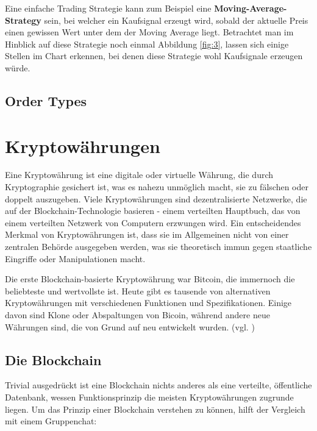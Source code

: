 \documentclass[oneside]{ausarbeitung}
\begin{document}
Eine einfache Trading Strategie kann zum Beispiel eine
\textbf{Moving-Average-Strategy} sein, bei welcher ein Kaufsignal
erzeugt wird, sobald der aktuelle Preis einen gewissen Wert unter dem
der Moving Average liegt. Betrachtet man im Hinblick auf diese
Strategie noch einmal Abbildung \ref{fig:3}, lassen sich einige
Stellen im Chart erkennen, bei denen diese Strategie wohl Kaufsignale
erzeugen würde.

\subsection{Order Types}
\label{sub:order_types}


\section{Kryptowährungen}
\label{sec:kryptowährungen}

Eine Kryptowährung ist eine digitale oder virtuelle Währung, die
durch Kryptographie gesichert ist, was es nahezu unmöglich macht, sie
zu fälschen oder doppelt auszugeben. Viele Kryptowährungen sind
dezentralisierte Netzwerke, die auf der Blockchain-Technologie
basieren - einem verteilten Hauptbuch, das von einem verteilten
Netzwerk von Computern erzwungen wird. Ein entscheidendes Merkmal von
Kryptowährungen ist, dass sie im Allgemeinen nicht von einer
zentralen Behörde ausgegeben werden, was sie theoretisch immun gegen
staatliche Eingriffe oder Manipulationen macht.

Die erste Blockchain-basierte Kryptowährung war Bitcoin, die
immernoch die beliebteste und wertvollste ist. Heute gibt es tausende
von alternativen Kryptowährungen mit verschiedenen Funktionen und
Spezifikationen. Einige davon sind Klone oder Abspaltungen von Bicoin,
während andere neue Währungen sind, die von Grund auf neu entwickelt
wurden. (vgl. \cite{cryptocurrency_explained})

\subsection{Die Blockchain}
\label{sub:blockchain}

Trivial ausgedrückt ist eine Blockchain nichts anderes als eine
verteilte, öffentliche Datenbank\cite{blockchain_definition}, wessen
Funktionsprinzip die meisten Kryptowährungen zugrunde
liegen\cite{blockchain_1}.
Um das Prinzip einer Blockchain verstehen zu können, hilft der
Vergleich mit einem Gruppenchat:
\end{document}
